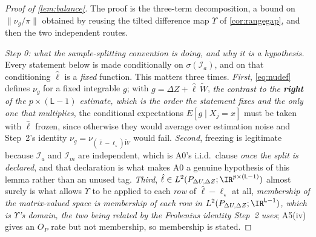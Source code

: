 \begin{proof}[Proof of \cref{lem:balance}]
The proof is the three-term decomposition, a bound on $\|\nu_g/\pi\|$ obtained by reusing the tilted
difference map $\Upsilon$ of \cref{cor:rangegap}, and then the two independent routes.

\emph{Step 0: what the sample-splitting convention is doing, and why it is a hypothesis.}
Every statement below is made conditionally on $\sigma(\mathcal I_a)$, and on that conditioning
$\hat\ell$ is a \emph{fixed} function. This matters three times. \emph{First}, \eqref{eq:nudef} defines
$\nu_g$ for a fixed integrable $g$; with $g=\Delta Z+\hat\ell\,\widetilde W$, \emph{the contrast to
the \textbf{right} of the $p\times(\mathsf L-1)$ estimate, which is the order the statement fixes and the
only one that multiplies}, the conditional expectations
$E[g\mid X_j=x]$ must be taken with $\hat\ell$ frozen, since otherwise they would average over estimation
noise and Step~2's identity $\nu_g=\nu_{(\hat\ell-\ell_\star)\widetilde W}$ would fail.
\emph{Second}, freezing is legitimate because $\mathcal I_a$ and $\mathcal I_m$ are independent, which is
A0's i.i.d.\ clause \emph{once the split is declared}, and that declaration
is what makes A0 a genuine hypothesis of this lemma rather than an unused tag. \emph{Third},
$\hat\ell\in L^{2}(P_{\Delta U,\Delta Z};\IR^{p\times(\mathsf L-1)})$ almost surely is what allows
$\Upsilon$ to be applied to each \emph{row} of
$\hat\ell-\ell_\star$ at all, \emph{membership of the matrix-valued space is membership of each row in
$L^{2}(P_{\Delta U,\Delta Z};\IR^{\mathsf L-1})$, which is $\Upsilon$'s domain, the two being related by
the Frobenius identity Step~2 uses}; A5(iv) gives an $O_P$ rate but not membership, so membership is stated.


\end{proof}
